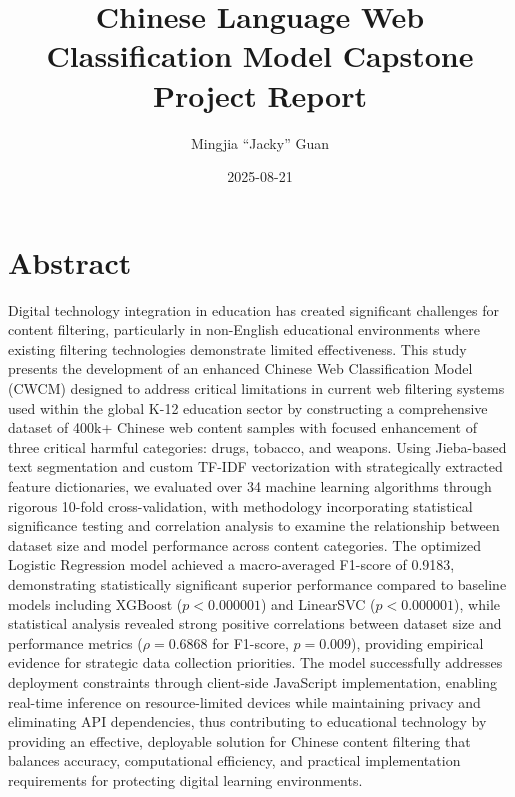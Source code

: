 \documentclass[
  titlepage]{article}
\title{Chinese Language Web Classification Model Capstone Project
Report}
\author{Mingjia ``Jacky'' Guan}
\date{2025-08-21}
\renewcommand*\contentsname{Table of contents}
\newcommand\contentsname{Table of contents}
\begin{document}
\maketitle

\renewcommand*\contentsname{Table of contents}
{
\hypersetup{linkcolor=}
\setcounter{tocdepth}{3}
\tableofcontents
}
\listoffigures
\listoftables

\newpage

\section*{Abstract}\label{abstract}

Digital technology integration in education has created significant
challenges for content filtering, particularly in non-English
educational environments where existing filtering technologies
demonstrate limited effectiveness. This study presents the development
of an enhanced Chinese Web Classification Model (CWCM) designed to
address critical limitations in current web filtering systems used
within the global K-12 education sector by constructing a comprehensive
dataset of 400k+ Chinese web content samples with focused enhancement of
three critical harmful categories: drugs, tobacco, and weapons. Using
Jieba-based text segmentation and custom TF-IDF vectorization with
strategically extracted feature dictionaries, we evaluated over 34
machine learning algorithms through rigorous 10-fold cross-validation,
with methodology incorporating statistical significance testing and
correlation analysis to examine the relationship between dataset size
and model performance across content categories. The optimized Logistic
Regression model achieved a macro-averaged F1-score of 0.9183,
demonstrating statistically significant superior performance compared to
baseline models including XGBoost (\(p < 0.000001\)) and LinearSVC
(\(p < 0.000001\)), while statistical analysis revealed strong positive
correlations between dataset size and performance metrics
(\(\rho = 0.6868\) for F1-score, \(p = 0.009\)), providing empirical
evidence for strategic data collection priorities. The model
successfully addresses deployment constraints through client-side
JavaScript implementation, enabling real-time inference on
resource-limited devices while maintaining privacy and eliminating API
dependencies, thus contributing to educational technology by providing
an effective, deployable solution for Chinese content filtering that
balances accuracy, computational efficiency, and practical
implementation requirements for protecting digital learning
environments.
\end{document}
